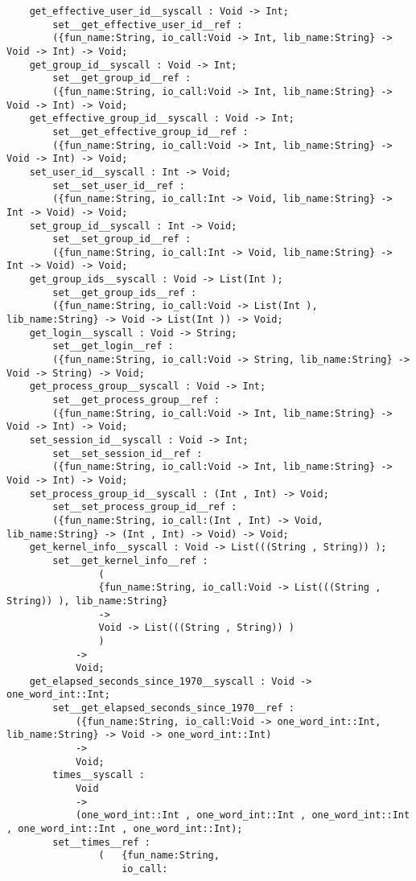 \begin{verbatim}
    get_effective_user_id__syscall : Void -> Int;
        set__get_effective_user_id__ref :
        ({fun_name:String, io_call:Void -> Int, lib_name:String} -> Void -> Int) -> Void;
    get_group_id__syscall : Void -> Int;
        set__get_group_id__ref :
        ({fun_name:String, io_call:Void -> Int, lib_name:String} -> Void -> Int) -> Void;
    get_effective_group_id__syscall : Void -> Int;
        set__get_effective_group_id__ref :
        ({fun_name:String, io_call:Void -> Int, lib_name:String} -> Void -> Int) -> Void;
    set_user_id__syscall : Int -> Void;
        set__set_user_id__ref :
        ({fun_name:String, io_call:Int -> Void, lib_name:String} -> Int -> Void) -> Void;
    set_group_id__syscall : Int -> Void;
        set__set_group_id__ref :
        ({fun_name:String, io_call:Int -> Void, lib_name:String} -> Int -> Void) -> Void;
    get_group_ids__syscall : Void -> List(Int );
        set__get_group_ids__ref :
        ({fun_name:String, io_call:Void -> List(Int ), lib_name:String} -> Void -> List(Int )) -> Void;
    get_login__syscall : Void -> String;
        set__get_login__ref :
        ({fun_name:String, io_call:Void -> String, lib_name:String} -> Void -> String) -> Void;
    get_process_group__syscall : Void -> Int;
        set__get_process_group__ref :
        ({fun_name:String, io_call:Void -> Int, lib_name:String} -> Void -> Int) -> Void;
    set_session_id__syscall : Void -> Int;
        set__set_session_id__ref :
        ({fun_name:String, io_call:Void -> Int, lib_name:String} -> Void -> Int) -> Void;
    set_process_group_id__syscall : (Int , Int) -> Void;
        set__set_process_group_id__ref :
        ({fun_name:String, io_call:(Int , Int) -> Void, lib_name:String} -> (Int , Int) -> Void) -> Void;
    get_kernel_info__syscall : Void -> List(((String , String)) );
        set__get_kernel_info__ref :
                (
                {fun_name:String, io_call:Void -> List(((String , String)) ), lib_name:String}
                ->
                Void -> List(((String , String)) )
                )
            ->
            Void;
    get_elapsed_seconds_since_1970__syscall : Void -> one_word_int::Int;
        set__get_elapsed_seconds_since_1970__ref :
            ({fun_name:String, io_call:Void -> one_word_int::Int, lib_name:String} -> Void -> one_word_int::Int)
            ->
            Void;
        times__syscall :
            Void
            ->
            (one_word_int::Int , one_word_int::Int , one_word_int::Int , one_word_int::Int , one_word_int::Int);
        set__times__ref :
                (   {fun_name:String,
                    io_call:

\end{verbatim}
